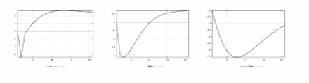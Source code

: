 \begin{figure}
\begin{tabular}{cccc}
\includegraphics[scale=0.22]{results_reinit/Investment_invshock_irf.png} & 
\includegraphics[scale=0.22]{results_reinit/Inflation_invshock_irf.png} & 
\includegraphics[scale=0.22]{results_reinit/Interest_Rate_invshock_irf.png} \\ \\ 

\end{tabular}
\end{figure}
